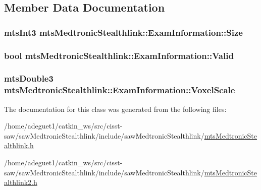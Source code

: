 \subsection{Member Data Documentation}
\hypertarget{classmts_medtronic_stealthlink_1_1_exam_information_ac1dbe5653a197a3e7245324baca6d720}{
\subsubsection[{Size}]{\setlength{\rightskip}{0pt plus 5cm}mts\-Int3 mts\-Medtronic\-Stealthlink\-::\-Exam\-Information\-::\-Size}}\label{classmts_medtronic_stealthlink_1_1_exam_information_ac1dbe5653a197a3e7245324baca6d720}
\hypertarget{classmts_medtronic_stealthlink_1_1_exam_information_af540507d17d3d78b0761c07449b0a10a}{
\subsubsection[{Valid}]{\setlength{\rightskip}{0pt plus 5cm}bool mts\-Medtronic\-Stealthlink\-::\-Exam\-Information\-::\-Valid}}\label{classmts_medtronic_stealthlink_1_1_exam_information_af540507d17d3d78b0761c07449b0a10a}
\hypertarget{classmts_medtronic_stealthlink_1_1_exam_information_ab60d4354a0497fd3f9f9738ce9105808}{
\subsubsection[{Voxel\-Scale}]{\setlength{\rightskip}{0pt plus 5cm}mts\-Double3 mts\-Medtronic\-Stealthlink\-::\-Exam\-Information\-::\-Voxel\-Scale}}\label{classmts_medtronic_stealthlink_1_1_exam_information_ab60d4354a0497fd3f9f9738ce9105808}


The documentation for this class was generated from the following files\-:\begin{DoxyCompactItemize}
\item 
/home/adeguet1/catkin\-\_\-ws/src/cisst-\/saw/saw\-Medtronic\-Stealthlink/include/saw\-Medtronic\-Stealthlink/\hyperlink{mts_medtronic_stealthlink_8h}{mts\-Medtronic\-Stealthlink.\-h}\item 
/home/adeguet1/catkin\-\_\-ws/src/cisst-\/saw/saw\-Medtronic\-Stealthlink/include/saw\-Medtronic\-Stealthlink/\hyperlink{mts_medtronic_stealthlink2_8h}{mts\-Medtronic\-Stealthlink2.\-h}\end{DoxyCompactItemize}
